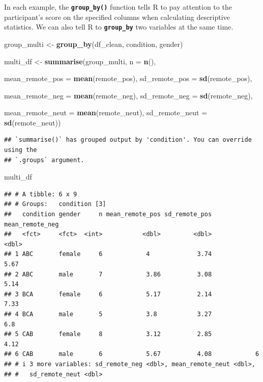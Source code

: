 \documentclass[
]{book}
\newenvironment{Shaded}{\begin{snugshade}}{\end{snugshade}}
\newcommand{\AttributeTok}[1]{\textcolor[rgb]{0.13,0.29,0.53}{#1}}
\newcommand{\FunctionTok}[1]{\textcolor[rgb]{0.13,0.29,0.53}{\textbf{#1}}}
\newcommand{\NormalTok}[1]{#1}
\newcommand{\OtherTok}[1]{\textcolor[rgb]{0.56,0.35,0.01}{#1}}
\begin{document}
In each example, the \textbf{\texttt{group\_by()}} function tells R to pay attention to the participant's score on the specified columns when calculating descriptive statistics. We can also tell R to \textbf{\texttt{group\_by}} two variables at the same time.

\begin{Shaded}
\begin{Highlighting}[]
\NormalTok{group\_multi }\OtherTok{\textless{}{-}} \FunctionTok{group\_by}\NormalTok{(df\_clean, condition, gender)}

\NormalTok{multi\_df }\OtherTok{\textless{}{-}} \FunctionTok{summarise}\NormalTok{(group\_multi,}
                      \AttributeTok{n =} \FunctionTok{n}\NormalTok{(), }
                        
                        \AttributeTok{mean\_remote\_pos =} \FunctionTok{mean}\NormalTok{(remote\_pos),}
                        \AttributeTok{sd\_remote\_pos =} \FunctionTok{sd}\NormalTok{(remote\_pos),}
          
                        \AttributeTok{mean\_remote\_neg =} \FunctionTok{mean}\NormalTok{(remote\_neg),}
                        \AttributeTok{sd\_remote\_neg =} \FunctionTok{sd}\NormalTok{(remote\_neg),}
          
                        \AttributeTok{mean\_remote\_neut =} \FunctionTok{mean}\NormalTok{(remote\_neut),}
                        \AttributeTok{sd\_remote\_neut =} \FunctionTok{sd}\NormalTok{(remote\_neut))}
\end{Highlighting}
\end{Shaded}

\begin{verbatim}
## `summarise()` has grouped output by 'condition'. You can override using the
## `.groups` argument.
\end{verbatim}

\begin{Shaded}
\begin{Highlighting}[]
\NormalTok{multi\_df}
\end{Highlighting}
\end{Shaded}

\begin{verbatim}
## # A tibble: 6 x 9
## # Groups:   condition [3]
##   condition gender     n mean_remote_pos sd_remote_pos mean_remote_neg
##   <fct>     <fct>  <int>           <dbl>         <dbl>           <dbl>
## 1 ABC       female     6            4             3.74            5.67
## 2 ABC       male       7            3.86          3.08            5.14
## 3 BCA       female     6            5.17          2.14            7.33
## 4 BCA       male       5            3.8           3.27            6.8 
## 5 CAB       female     8            3.12          2.85            4.12
## 6 CAB       male       6            5.67          4.08            6   
## # i 3 more variables: sd_remote_neg <dbl>, mean_remote_neut <dbl>,
## #   sd_remote_neut <dbl>
\end{verbatim}
\end{document}
